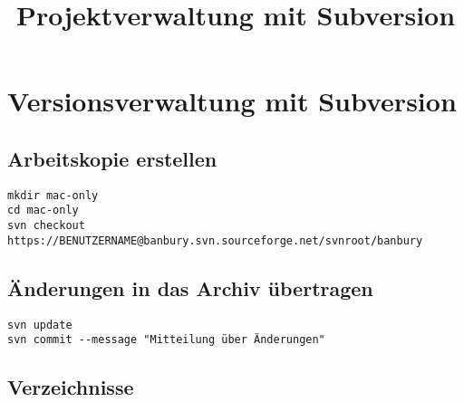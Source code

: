 \documentclass[
  final,      %
  idxtotoc,   %
  tocleft,    %
  a4paper,    %
  abstracton, %
  titlepage,  %
  oneside,    %
  DIVcalc
]{scrartcl}
\newcommand{\ABSCHNITTSTRENNER}{\cleardoublepage }
\begin{document}
\title{
Projektverwaltung mit Subversion
}
\author{}
\maketitle
\thispagestyle{plainwfl}

\mbox{}

\vfill




\markleft{}

\ABSCHNITTSTRENNER
{}
\tableofcontents

\ABSCHNITTSTRENNER
{}
\section{Versionsverwaltung mit Subversion}

\subsection{Arbeitskopie erstellen}
\begin{Verbatim}
mkdir mac-only 
cd mac-only 
svn checkout https://BENUTZERNAME@banbury.svn.sourceforge.net/svnroot/banbury
\end{Verbatim}


\subsection{Änderungen in das Archiv übertragen}
\begin{Verbatim}
svn update
svn commit --message "Mitteilung über Änderungen"
\end{Verbatim}


\subsection{Verzeichnisse}
\end{document}
